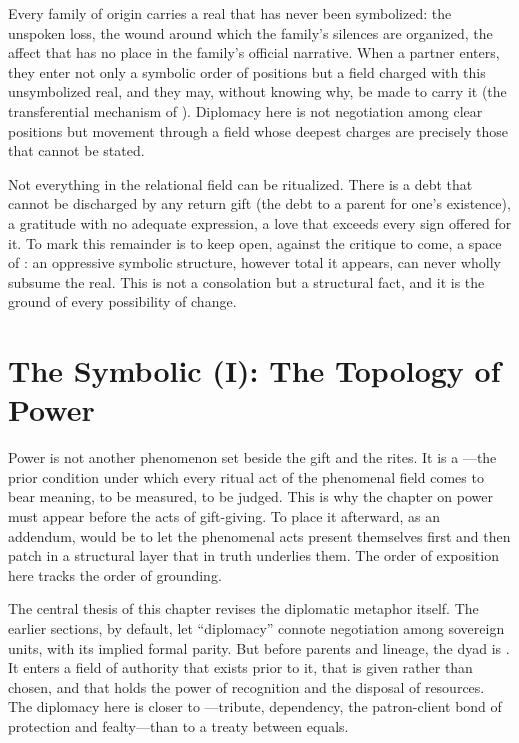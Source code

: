  Every family of origin carries a real that has never been symbolized: the unspoken loss, the wound around which the family's silences are organized, the affect that has no place in the family's official narrative. When a partner enters, they enter not only a symbolic order of positions but a field charged with this unsymbolized real, and they may, without knowing why, be made to carry it (the transferential mechanism of ). Diplomacy here is not negotiation among clear positions but movement through a field whose deepest charges are precisely those that cannot be stated.

 Not everything in the relational field can be ritualized. There is a debt that cannot be discharged by any return gift (the debt to a parent for one's existence), a gratitude with no adequate expression, a love that exceeds every sign offered for it. To mark this remainder is to keep open, against the critique to come, a space of : an oppressive symbolic structure, however total it appears, can never wholly subsume the real. This is not a consolation but a structural fact, and it is the ground of every possibility of change.

\section{The Symbolic (I): The Topology of Power}\label{p07:sec:power}

Power is not another phenomenon set beside the gift and the rites. It is a ---the prior condition under which every ritual act of the phenomenal field comes to bear meaning, to be measured, to be judged. This is why the chapter on power must appear before the acts of gift-giving. To place it afterward, as an addendum, would be to let the phenomenal acts present themselves first and then patch in a structural layer that in truth underlies them. The order of exposition here tracks the order of grounding.

The central thesis of this chapter revises the diplomatic metaphor itself. The earlier sections, by default, let ``diplomacy'' connote negotiation among sovereign units, with its implied formal parity. But before parents and lineage, the dyad is . It enters a field of authority that exists prior to it, that is given rather than chosen, and that holds the power of recognition and the disposal of resources. The diplomacy here is closer to ---tribute, dependency, the patron-client bond of protection and fealty---than to a treaty between equals.


